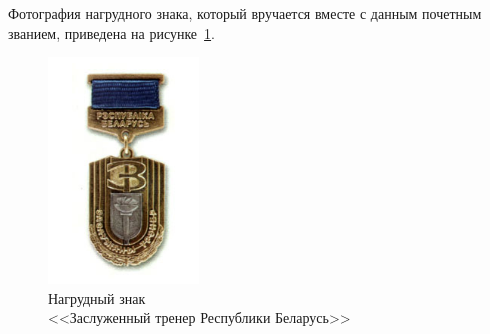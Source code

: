 Фотография нагрудного знака, 
который вручается вместе с данным почетным званием, 
приведена на рисунке~\ref{fig:trener_belarus}.

\begin{figure}[h]
  \centering
  \includegraphics[width=40mm]{pic/trener_belarus.jpg}
  \caption{Нагрудный знак \\ <<Заслуженный тренер Республики Беларусь>>}
  \label{fig:trener_belarus}
\end{figure}
